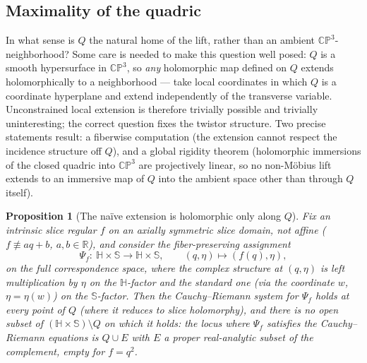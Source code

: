 \documentclass[11pt]{amsart}
\theoremstyle{plain}
\newtheorem{proposition}[theorem]{Proposition}
\theoremstyle{definition}
\theoremstyle{remark}
\newcommand{\HH}{\mathbb{H}}
\newcommand{\RR}{\mathbb{R}}
\newcommand{\CP}{\mathbb{CP}}
\renewcommand{\SS}{\mathbb{S}}
\begin{document}
\subsection{Maximality of the quadric}\label{subsec:maximality}

In what sense is $Q$ the natural home of the lift, rather than an ambient $\CP^3$-neighborhood?
Some care is needed to make this question well posed: $Q$ is a smooth hypersurface in $\CP^3$, so
\emph{any} holomorphic map defined on $Q$ extends holomorphically to a neighborhood --- take local
coordinates in which $Q$ is a coordinate hyperplane and extend independently of the transverse
variable. Unconstrained local extension is therefore trivially possible and trivially
uninteresting; the correct question fixes the twistor structure. Two precise statements result: a
fiberwise computation (the extension cannot respect the incidence structure off $Q$), and a global
rigidity theorem (holomorphic immersions of the closed quadric into $\CP^3$ are projectively
linear, so no non-M\"obius lift extends to an immersive map of $Q$ into the ambient space other
than through $Q$ itself).

\begin{proposition}[The na\"ive extension is holomorphic only along $Q$]\label{prop:naive}
Fix an intrinsic slice regular $f$ on an axially symmetric slice domain, not affine
($f\not\equiv aq+b$, $a,b\in\RR$), and consider the fiber-preserving assignment
\[
\Psi_f\colon\ \HH\times\SS\to\HH\times\SS,\qquad (q,\eta)\mapsto(f(q),\eta),
\]
on the full correspondence space, where the complex structure at $(q,\eta)$ is left multiplication
by $\eta$ on the $\HH$-factor and the standard one (via the coordinate $w$, $\eta=\eta(w)$) on the
$\SS$-factor. Then the Cauchy--Riemann system for $\Psi_f$ holds at every point of $Q$
(where it reduces to slice holomorphy), and there is \emph{no open subset of}
$(\HH\times\SS)\setminus Q$ on which it holds: the locus where $\Psi_f$ satisfies the
Cauchy--Riemann equations is $Q\cup E$ with $E$ a proper real-analytic subset of the complement,
empty for $f=q^2$.
\end{proposition}
\end{document}
